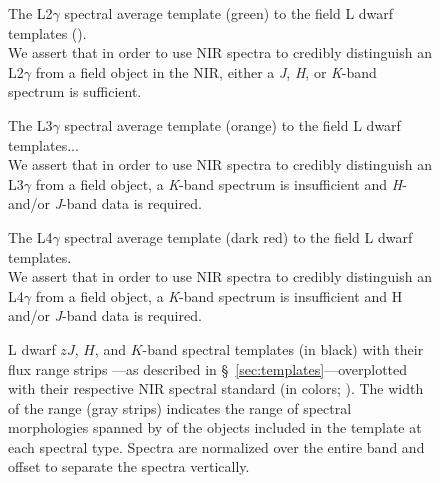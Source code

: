 \documentclass[12pt,preprint]{aastex}
\begin{document}
\begin{figure}
	\caption{The L2$\gamma$ spectral average template (green) to the field L dwarf templates (). \\
	We assert that in order to use NIR spectra to credibly distinguish an L2$\gamma$ from a field object in the NIR, either a \emph{J}, \emph{H}, or \emph{K}-band spectrum is sufficient.}
	\label{fig:L2lg-field}
\end{figure}

\begin{figure}
	\caption{The L3$\gamma$ spectral average template (orange) to the field L dwarf templates... \\
	We assert that in order to use NIR spectra to credibly distinguish an L3$\gamma$ from a field object, a \emph{K}-band spectrum is insufficient and \emph{H}- and/or \emph{J}-band data is required.}
	\label{fig:L3lg-field}
\end{figure}

\begin{figure}
	\caption{The L4$\gamma$ spectral average template (dark red) to the field L dwarf templates. \\
	We assert that in order to use NIR spectra to credibly distinguish an L4$\gamma$ from a field object, a \emph{K}-band spectrum is insufficient and H and/or \emph{J}-band data is required.}
	\label{fig:L4lg-field}
\end{figure}


\clearpage

\begin{figure}
		\caption{
	L dwarf $zJ$, $H$, and $K$-band spectral templates (in black) with their flux range strips ---as described in \S~\ref{sec:templates}---overplotted with their respective NIR spectral standard (in colors; \cite{Kirkpatrick10}). 
	The width of the range (gray strips) indicates the range of spectral morphologies spanned by of the objects included in the template at each spectral type.
	Spectra are normalized over the entire band and offset to separate the spectra vertically.
	}
	\label{fig:templates-stds}
\end{figure}
\end{document}
